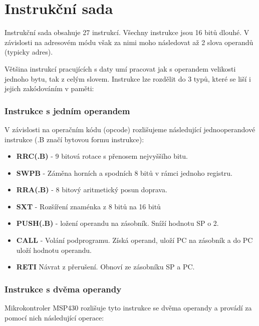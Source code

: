 \section{Instrukční sada}

Instrukční sada obsahuje 27 instrukcí. Všechny instrukce jsou 16 bitů dlouhé. V závislosti na adresovém módu však za nimi moho následovat až 2 slova operandů (typicky adres).

Většina instrukcí pracujících s daty umí pracovat jak s operandem velikosti jednoho bytu, tak z celým slovem. Instrukce lze rozdělit do 3 typů, které se liší i jejich zakódováním v paměti:

\subsubsection{Instrukce s jedním operandem}

V závislosti na operačním kódu (opcode) rozlišujeme následující jednooperandové instrukce (.B značí bytovou formu instrukce):

\begin{itemize}
\item \textbf{RRC(.B)} - 9 bitová rotace s přenosem nejvyššího bitu.
\item \textbf{SWPB} - Záměna horních a spodních 8 bitů v rámci jednoho registru.
\item \textbf{RRA(.B)} - 8 bitový aritmetický posun doprava.
\item \textbf{SXT} - Rozšíření znaménka z 8 bitů na 16 bitů
\item \textbf{PUSH(.B)} - ložení operandu na zásobník. Sníží hodnotu SP o 2.
\item \textbf{CALL} - Volání podprogramu. Získá operand, uloží PC na zásobník a do PC uloží hodnotu operandu.
\item \textbf{RETI}	Návrat z přerušení. Obnoví ze zásobníku SP a PC.
\end{itemize}

\subsubsection{Instrukce s dvěma operandy}

Mikrokontroler MSP430 rozlišuje tyto instrukce se dvěma operandy a provádí za pomocí nich následující operace:

